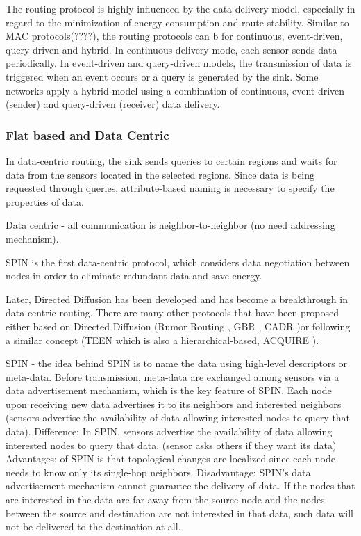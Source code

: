 The routing protocol is highly influenced by the data delivery model, especially in regard to the minimization of energy consumption and route stability. Similar to MAC protocols(????), the routing protocols can b for continuous, event-driven, query-driven and hybrid. In continuous delivery mode, each sensor sends data periodically. In event-driven and query-driven models, the transmission of data is triggered when an event occurs or a query is generated by the sink. Some networks apply a hybrid model using a combination of continuous, event-driven (sender) and query-driven (receiver) data delivery. \cite{akkaya2005survey}

\subsubsection{Flat based and Data Centric}
In data-centric routing, the sink sends queries to certain regions and waits for data from the sensors located in the selected regions. Since data is being requested through queries, attribute-based naming is necessary to specify the properties of data. 

Data centric - all communication is neighbor-to-neighbor (no need addressing mechanism). 

SPIN \cite{spin} is the first data-centric protocol, which considers data negotiation between nodes in order to eliminate redundant data and save energy.

Later, Directed Diffusion \cite{directeddiffusion} has been developed and has become a breakthrough in data-centric routing. There are many other protocols that have been proposed either based on Directed Diffusion (Rumor Routing \cite{rumorrouting}, GBR \cite{schurgers2001energy}, CADR \cite{cadr})or following a similar concept (TEEN \cite{teen} which is also a hierarchical-based, ACQUIRE \cite{acquire}).

SPIN - the idea behind SPIN is to name the data using high-level descriptors or meta-data. Before transmission, meta-data are exchanged among sensors via a data advertisement mechanism, which is the key feature of SPIN. Each node upon receiving new data advertises it to its neighbors and interested neighbors (sensors advertise the availability of data allowing interested nodes to query that data). 
Difference: In SPIN, sensors advertise the availability of data allowing interested nodes to query that data. (sensor asks others if they want its data)
Advantages: of SPIN is that topological changes are localized since each node needs to know only its single-hop neighbors. 
Disadvantage: SPIN's data advertisement mechanism cannot guarantee the delivery of data. If the nodes that are interested in the data are far away from the source node and the nodes between the source and destination are not interested in that data, such data will not be delivered to the destination at all. 

